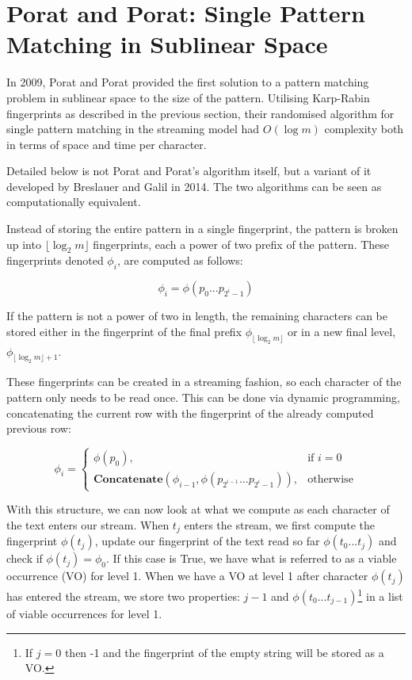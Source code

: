 \documentclass[ %
                    author={Dominic Joseph Moylett},
                    degree={MEng},
                     title={Dictionary Matching with Fingerprints},
                  subtitle={An Empirical Analysis},
                      type={research},
                      year={2015} ]{dissertation}
\begin{document}
\section{Porat and Porat: Single Pattern Matching in Sublinear Space}
\label{sec:porat-porat}

In 2009, Porat and Porat\cite{5438620} provided the first solution to a pattern matching problem in sublinear space to the size of the pattern. Utilising Karp-Rabin fingerprints as described in the previous section, their randomised algorithm for single pattern matching in the streaming model had $O(\log m)$ complexity both in terms of space and time per character.

Detailed below is not Porat and Porat's algorithm itself, but a variant of it developed by Breslauer and Galil in 2014\cite{Breslauer:2014:RSS:2660854.2635814}. The two algorithms can be seen as computationally equivalent.

Instead of storing the entire pattern in a single fingerprint, the pattern is broken up into $\lfloor \log_2 m\rfloor$ fingerprints, each a power of two prefix of the pattern. These fingerprints denoted $\phi_i$, are computed as follows:

$$\phi_i = \phi(p_0...p_{2^i-1})$$

If the pattern is not a power of two in length, the remaining characters can be stored either in the fingerprint of the final prefix $\phi_{\lfloor\log_2m\rfloor}$ or in a new final level, $\phi_{\lfloor\log_2m\rfloor + 1}$.

These fingerprints can be created in a streaming fashion, so each character of the pattern only needs to be read once. This can be done via dynamic programming, concatenating the current row with the fingerprint of the already computed previous row:

\[
  \phi_i =
  \begin{cases}
    \phi(p_0),& \text{if } i = 0\\
    \textbf{Concatenate}(\phi_{i - 1}, \phi(p_{2^{i-1}}...p_{2^i-1})),& \text{otherwise}
  \end{cases}
\]

With this structure, we can now look at what we compute as each character of the text enters our stream. When $t_j$ enters the stream, we first compute the fingerprint $\phi(t_j)$, update our fingerprint of the text read so far $\phi(t_0...t_j)$ and check if $\phi(t_j) = \phi_0$. If this case is True, we have what is referred to as a viable occurrence (VO) for level 1. When we have a VO at level 1 after character $\phi(t_j)$ has entered the stream, we store two properties: $j-1$ and $\phi(t_0...t_{j-1})$\footnote{If $j = 0$ then -1 and the fingerprint of the empty string will be stored as a VO.} in a list of viable occurrences for level 1.
\end{document}
